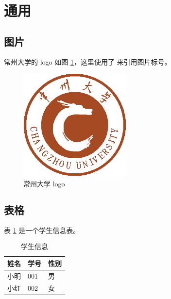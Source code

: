 \documentclass[a4paper, 11pt]{ctexart}
\begin{document}
\clearpage
\phantom{s}
\thispagestyle{empty}

\clearpage
\tableofcontents
\thispagestyle{empty} %

\clearpage
\phantom{s}
\thispagestyle{empty}

\clearpage \setcounter{page}{1} %
\section{通用}

\subsection{图片}

常州大学的 logo 如图 \ref{fig:cczu}，这里使用了 \codeinline{\ref{fig:cczu}} 来引用图片标号。

\begin{figure}[htp]
    \centering\includegraphics[width=0.5\textwidth]{cczu}
    \caption{常州大学 logo}
    \label{fig:cczu}
\end{figure}

\subsection{表格}

表 \ref{tab:student-table} 是一个学生信息表。

\begin{table}[htp]
    \centering
    \begin{tabularx}{\textwidth}{XXX}
        \toprule  %
        姓名 & 学号 & 性别 \\
        \midrule  %
        小明 & 001  & 男   \\
        小红 & 002  & 女   \\
        \bottomrule %
    \end{tabularx}
    \caption{学生信息}
    \label{tab:student-table}
\end{table}
\end{document}
